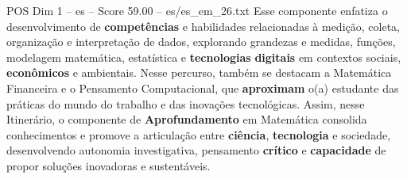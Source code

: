 \begin{textsample}{POS Dim 1 – es – Score 59.00 – es/es\_em\_26.txt}
Esse componente enfatiza o desenvolvimento de \textbf{competências} e habilidades relacionadas à medição, coleta, organização e interpretação de dados, explorando grandezas e medidas, funções, modelagem matemática, estatística e \textbf{tecnologias} \textbf{digitais} em contextos sociais, \textbf{econômicos} e ambientais.
Nesse percurso, também se destacam a Matemática Financeira e o Pensamento Computacional, que \textbf{aproximam} o(a) estudante das práticas do mundo do trabalho e das inovações tecnológicas.
Assim, nesse Itinerário, o componente de \textbf{Aprofundamento} em Matemática consolida conhecimentos e promove a articulação entre \textbf{ciência}, \textbf{tecnologia} e sociedade, desenvolvendo autonomia investigativa, pensamento \textbf{crítico} e \textbf{capacidade} de propor soluções inovadoras e sustentáveis.

\end{textsample}
